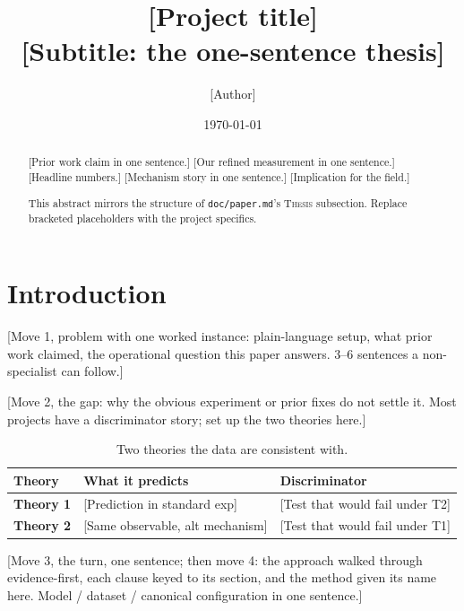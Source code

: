 \documentclass[11pt, letterpaper]{article}
\title{{[Project title]}\\
  {[Subtitle: the one-sentence thesis]}}
\author{[Author]}
\affil{[Affiliation]}
\date{\today}
\begin{document}
\maketitle

\begin{abstract}
[Prior work claim in one sentence.] [Our refined measurement in one
sentence.] [Headline numbers.] [Mechanism story in one sentence.]
[Implication for the field.]

This abstract mirrors the structure of \texttt{doc/paper.md}'s
\textsc{Thesis} subsection. Replace bracketed placeholders with the
project specifics.
\end{abstract}

\section{Introduction}
\label{sec:intro}


[Move 1, problem with one worked instance: plain-language setup, what
prior work claimed, the operational question this paper answers. 3--6
sentences a non-specialist can follow.]

[Move 2, the gap: why the obvious experiment or prior fixes do not
settle it. Most projects have a discriminator story; set up the two
theories here.]

\begin{table}[t]
\centering
\small
\caption{Two theories the data are consistent with.}
\label{tab:theories}
\begin{tabular}{p{}p{}p{}}
\toprule
\textbf{Theory} & \textbf{What it predicts} & \textbf{Discriminator}\\
\midrule
\textbf{Theory 1} & [Prediction in standard exp] & [Test that would fail under T2] \\
\textbf{Theory 2} & [Same observable, alt mechanism] & [Test that would fail under T1] \\
\bottomrule
\end{tabular}
\end{table}

[Move 3, the turn, one sentence; then move 4: the approach walked
through evidence-first, each clause keyed to its section, and the
method given its name here. Model / dataset / canonical configuration
in one sentence.]
\end{document}
